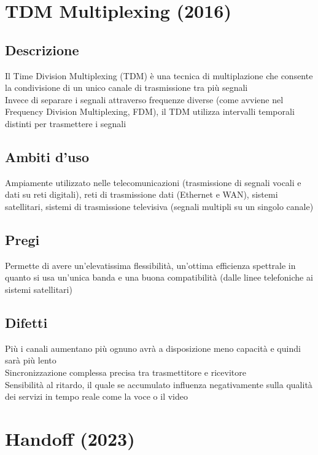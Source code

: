 \documentclass[10pt,oneside,a4paper]{article}
\begin{document}
\section{TDM Multiplexing (2016)}
\subsection{Descrizione}
Il Time Division Multiplexing (TDM) è una tecnica di multiplazione che consente la condivisione di un unico canale di trasmissione tra più segnali\\
Invece di separare i segnali attraverso frequenze diverse (come avviene nel Frequency Division Multiplexing, FDM), il TDM utilizza intervalli temporali distinti per trasmettere i segnali
\subsection{Ambiti d'uso}
Ampiamente utilizzato nelle telecomunicazioni (trasmissione di segnali vocali e dati su reti digitali), reti di trasmissione dati (Ethernet e WAN), sistemi satellitari, sistemi di trasmissione televisiva (segnali multipli su un singolo canale)
\subsection{Pregi}
Permette di avere un'elevatissima flessibilità, un'ottima efficienza spettrale in quanto si usa un'unica banda e una buona compatibilità (dalle linee telefoniche ai sistemi satellitari)
\subsection{Difetti}
Più i canali aumentano più ognuno avrà a disposizione meno capacità e quindi sarà più lento\\
Sincronizzazione complessa precisa tra trasmettitore e ricevitore\\
Sensibilità al ritardo, il quale se accumulato influenza negativamente sulla qualità dei servizi in tempo reale come la voce o il video
\section{Handoff (2023)}
\end{document}
